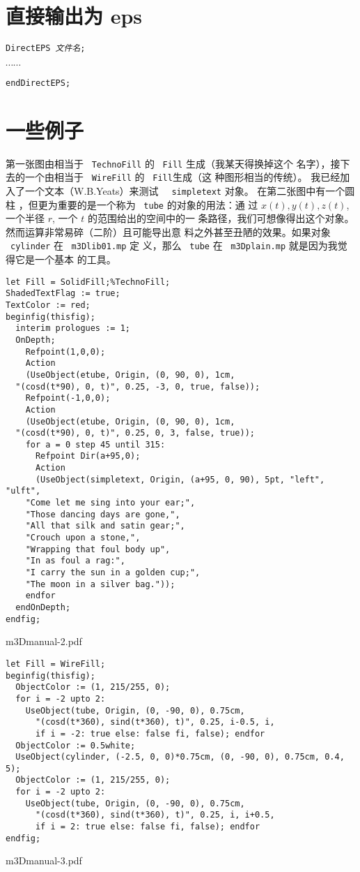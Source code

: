 \documentclass[a4paper,12pt]{article}
\begin{document}
\section{直接输出为 eps }
{\tt DirectEPS {\it 文件名};}

$\cdots\cdots$

{\tt endDirectEPS;}


\section{一些例子}
第一张图由相当于 ~{\tt TechnoFill} 的 ~{\tt Fill} 生成（我某天得换掉这个
名字），接下去的一个由相当于  ~{\tt WireFill} 的 ~{\tt Fill}生成（这
种图形相当的传统）。 我已经加入了一个文本（W.B.Yeats）来测试 ~{\tt
  simpletext} 对象。 
在第二张图中有一个圆柱 ，但更为重要的是一个称为 ~{\tt tube} 的对象的用法：通
过 $x(t), y(t), z(t)$,  一个半径 $r$, 一个 $t$ 的范围给出的空间中的一
条路径，我们可想像得出这个对象。 然而运算非常易碎（二阶）且可能导出意
料之外甚至丑陋的效果。如果对象  ~{\tt cylinder} 在 ~{\tt m3Dlib01.mp} 定
义，那么 ~{\tt tube} 在 ~{\tt   m3Dplain.mp} 就是因为我觉得它是一个基本
的工具。 

\begin{verbatim}
let Fill = SolidFill;%TechnoFill;
ShadedTextFlag := true;
TextColor := red;
beginfig(thisfig);
  interim prologues := 1;
  OnDepth;
    Refpoint(1,0,0);
    Action
    (UseObject(etube, Origin, (0, 90, 0), 1cm,
  "(cosd(t*90), 0, t)", 0.25, -3, 0, true, false));
    Refpoint(-1,0,0);
    Action
    (UseObject(etube, Origin, (0, 90, 0), 1cm,
  "(cosd(t*90), 0, t)", 0.25, 0, 3, false, true));
    for a = 0 step 45 until 315:
      Refpoint Dir(a+95,0);
      Action
      (UseObject(simpletext, Origin, (a+95, 0, 90), 5pt, "left", "ulft",
    "Come let me sing into your ear;",
    "Those dancing days are gone,",
    "All that silk and satin gear;",
    "Crouch upon a stone,",
    "Wrapping that foul body up",
    "In as foul a rag:",
    "I carry the sun in a golden cup;",
    "The moon in a silver bag."));
    endfor
  endOnDepth;
endfig;
\end{verbatim}
\centerline{\XeTeXpdffile m3Dmanual-2.pdf}


\begin{verbatim}
let Fill = WireFill;
beginfig(thisfig);
  ObjectColor := (1, 215/255, 0);
  for i = -2 upto 2:
    UseObject(tube, Origin, (0, -90, 0), 0.75cm,
      "(cosd(t*360), sind(t*360), t)", 0.25, i-0.5, i,
      if i = -2: true else: false fi, false); endfor
  ObjectColor := 0.5white;
  UseObject(cylinder, (-2.5, 0, 0)*0.75cm, (0, -90, 0), 0.75cm, 0.4, 5);
  ObjectColor := (1, 215/255, 0);
  for i = -2 upto 2:
    UseObject(tube, Origin, (0, -90, 0), 0.75cm,
      "(cosd(t*360), sind(t*360), t)", 0.25, i, i+0.5,
      if i = 2: true else: false fi, false); endfor
endfig;
\end{verbatim}
\centerline{\XeTeXpdffile m3Dmanual-3.pdf}
\end{document}
